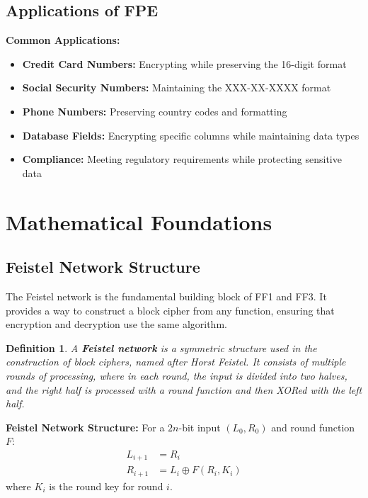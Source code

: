 \documentclass[11pt,a4paper]{article}
\newtheorem{definition}[theorem]{Definition}
\begin{document}
\subsection{Applications of FPE}

\begin{examplebox}
\textbf{Common Applications:}
\begin{itemize}
    \item \textbf{Credit Card Numbers:} Encrypting while preserving the 16-digit format
    \item \textbf{Social Security Numbers:} Maintaining the XXX-XX-XXXX format
    \item \textbf{Phone Numbers:} Preserving country codes and formatting
    \item \textbf{Database Fields:} Encrypting specific columns while maintaining data types
    \item \textbf{Compliance:} Meeting regulatory requirements while protecting sensitive data
\end{itemize}
\end{examplebox}

\section{Mathematical Foundations}

\subsection{Feistel Network Structure}

The Feistel network is the fundamental building block of FF1 and FF3. It provides a way to construct a block cipher from any function, ensuring that encryption and decryption use the same algorithm.

\begin{definition}
A \textbf{Feistel network} is a symmetric structure used in the construction of block ciphers, named after Horst Feistel. It consists of multiple rounds of processing, where in each round, the input is divided into two halves, and the right half is processed with a round function and then XORed with the left half.
\end{definition}

\begin{mathbox}
\textbf{Feistel Network Structure:}
For a $2n$-bit input $(L_0, R_0)$ and round function $F$:
\begin{align*}
L_{i+1} &= R_i \\
R_{i+1} &= L_i \oplus F(R_i, K_i)
\end{align*}
where $K_i$ is the round key for round $i$.
\end{mathbox}
\end{document}
